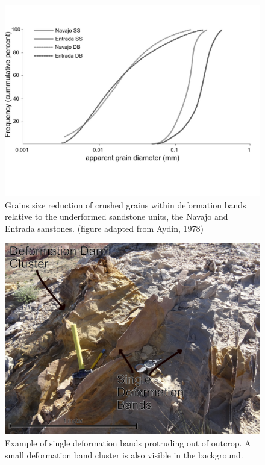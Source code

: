 \documentclass[12pt,a4paper]{article}
\begin{document}
\begin{figure}[h]
	\centering

		\includegraphics[width=\textwidth]{Grain_size_distribution}

	\caption{Grains size reduction of crushed grains within deformation bands relative to the underformed sandstone units, the Navajo and Entrada sanstones. (figure adapted from Aydin, 1978)}
	\label{grain_size}
\end{figure} 


\begin{figure}[h]
	\centering

		\includegraphics[width=\textwidth]{Defomation_Bands}

	\caption{Example of single deformation bands protruding out of outcrop. A small deformation band cluster is also visible in the background.}
	\label{deformation_band}
\end{figure} 
\end{document}
